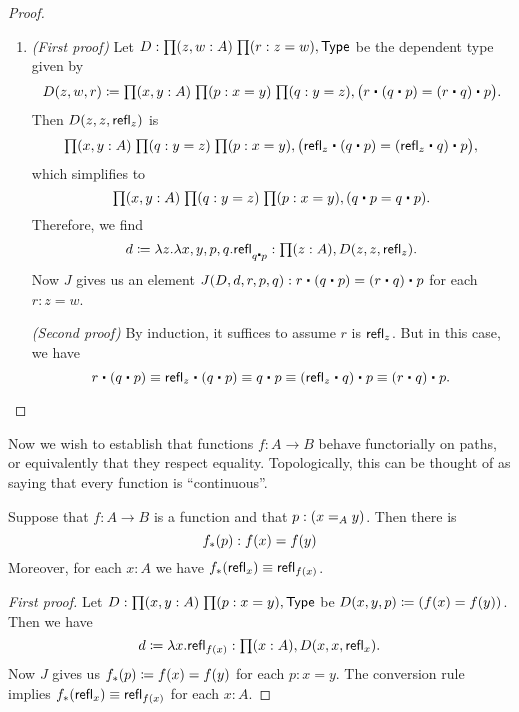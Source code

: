 \begin{proof}
\begin{enumerate}
    \noindent \emph{(Second proof)} By induction, it suffices to assume $p$ is $\refl x$.
    But in this case, we have $\opp{\opp{p}}\jdeq \opp{\opp{\refl x}} \jdeq \refl x$.
  \item \emph{(First proof)} Let $D:\prd{z,w:A}{r:z=w} \type$ be the dependent type given by
    \begin{equation*}
      D(z,w,r)\defeq\prd{x,y:A}{p:x= y}{q:y= z} \big(r\ct (q\ct p)=  (r\ct q)\ct p\big).
    \end{equation*}
    Then $D(z,z,\refl{z})$ is
    \begin{equation*}
      \prd{x,y:A}{q:y= z}{p:x= y} \big(\refl{z}\ct(q\ct p)= (\refl{z}\ct q)\ct p\big),
    \end{equation*}
    which simplifies to
    \begin{equation*}
      \prd{x,y:A}{q:y= z}{p:x= y} (q\ct p= q\ct p).
    \end{equation*}
    Therefore, we find
    \begin{equation*}
      d\defeq\lambda z.\lambda x,y,p,q.\refl{q\ct p}:\prd{z:A} D(z,z,\refl{z}).
    \end{equation*}
    Now $J$ gives us an element $J(D,d,r,p,q):r\ct (q\ct p)= (r\ct q)\ct p$ for each $r:z= w$.

    \noindent \emph{(Second proof)} By induction, it suffices to assume $r$ is $\refl z$.
    But in this case, we have
    \[ r\ct (q\ct p) \jdeq \refl{z}\ct(q\ct p) \jdeq q\ct p \jdeq (\refl{z}\ct q)\ct p
    \jdeq (r\ct q)\ct p.\qedhere
    \]
  \end{enumerate}
\end{proof}

Now we wish to establish that functions $f:A\to B$ behave functorially on paths, or equivalently that they respect equality.
Topologically, this can be thought of as saying that every function is ``continuous''.

\begin{lem}\label{lem:map}
  Suppose that $f:A\to B$ is a function and that $p:(\id[A]xy)$. Then there is
  \begin{equation*}
    \map f p : f(x)= f(y)
  \end{equation*}
  Moreover, for each $x:A$ we have $\map {f}{\refl{x}}\jdeq \refl{f(x)}$.
\end{lem}

\begin{proof}[First proof]
  Let $D:\prd{x,y:A}{p:x=y}\type$ be $D(x,y,p)\defeq (f(x)= f(y))$.
  Then we have
  \begin{equation*}
    d\defeq\lambda x.\refl{f(x)}:\prd{x:A} D(x,x,\refl{x}).
  \end{equation*}
  Now $J$ gives us $\map f p\defeq f(x)= f(y)$ for each $p:x= y$.
  The conversion rule implies $\map f{\refl{x}}\jdeq\refl{f(x)}$ for each $x:A$.
\end{proof}

